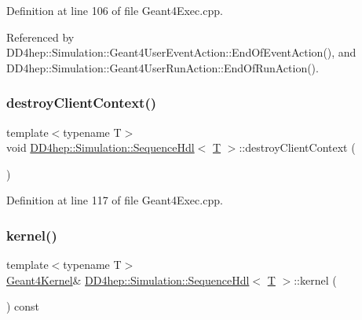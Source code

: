 Definition at line 106 of file Geant4\+Exec.\+cpp.



Referenced by D\+D4hep\+::\+Simulation\+::\+Geant4\+User\+Event\+Action\+::\+End\+Of\+Event\+Action(), and D\+D4hep\+::\+Simulation\+::\+Geant4\+User\+Run\+Action\+::\+End\+Of\+Run\+Action().

\hypertarget{class_d_d4hep_1_1_simulation_1_1_sequence_hdl_a8134448bdd2dd9d0e2f5d5834aa6a60f}{}\label{class_d_d4hep_1_1_simulation_1_1_sequence_hdl_a8134448bdd2dd9d0e2f5d5834aa6a60f} 
\subsubsection{\texorpdfstring{destroy\+Client\+Context()}{destroyClientContext()}\hspace{0.1cm}{\footnotesize\ttfamily [2/2]}}
{\footnotesize\ttfamily template$<$typename T$>$ \\
void \hyperlink{class_d_d4hep_1_1_simulation_1_1_sequence_hdl}{D\+D4hep\+::\+Simulation\+::\+Sequence\+Hdl}$<$ \hyperlink{class_t}{T} $>$\+::destroy\+Client\+Context (\begin{DoxyParamCaption}\item[{const G4\+Event $\ast$}]{ }\end{DoxyParamCaption})\hspace{0.3cm}{\ttfamily [inline]}}



Definition at line 117 of file Geant4\+Exec.\+cpp.

\hypertarget{class_d_d4hep_1_1_simulation_1_1_sequence_hdl_a89eb0b58f4614f5fd03a656e3b6da8da}{}\label{class_d_d4hep_1_1_simulation_1_1_sequence_hdl_a89eb0b58f4614f5fd03a656e3b6da8da} 
\subsubsection{\texorpdfstring{kernel()}{kernel()}}
{\footnotesize\ttfamily template$<$typename T$>$ \\
\hyperlink{class_d_d4hep_1_1_simulation_1_1_geant4_kernel}{Geant4\+Kernel}\& \hyperlink{class_d_d4hep_1_1_simulation_1_1_sequence_hdl}{D\+D4hep\+::\+Simulation\+::\+Sequence\+Hdl}$<$ \hyperlink{class_t}{T} $>$\+::kernel (\begin{DoxyParamCaption}{ }\end{DoxyParamCaption}) const\hspace{0.3cm}{\ttfamily [inline]}}



